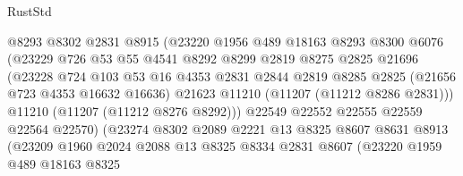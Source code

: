 \begin{lexlean}{RustStd}
\begin{coremodule}
                            @8293
                            @8302
                            @2831
                            @8915
                            (@23220
                              @1956
                              @489
                              @18163
                              @8293
                              @8300
                              @6076
                              (@23229
                                @726
                                @53
                                @55
                                @4541
                                @8292
                                @8299
                                @2819
                                @8275
                                @2825
                                @21696
                                (@23228
                                  @724
                                  @103
                                  @53
                                  @16
                                  @4353
                                  @2831
                                  @2844
                                  @2819
                                  @8285
                                  @2825
                                  (@21656 @723 @4353 @16632 @16636)
                                  @21623
                                  @11210
                                  (@11207 (@11212 @8286 @2831)))
                                @11210
                                (@11207 (@11212 @8276 @8292)))
                              @22549
                              @22552
                              @22555
                              @22559
                              @22564
                              @22570)
                            (@23274
                              @8302
                              @2089
                              @2221
                              @13
                              @8325
                              @8607
                              @8631
                              @8913
                              (@23209
                                @1960
                                @2024
                                @2088
                                @13
                                @8325
                                @8334
                                @2831
                                @8607
                                (@23220
                                  @1959
                                  @489
                                  @18163
                                  @8325

\end{coremodule}
\end{lexlean}

